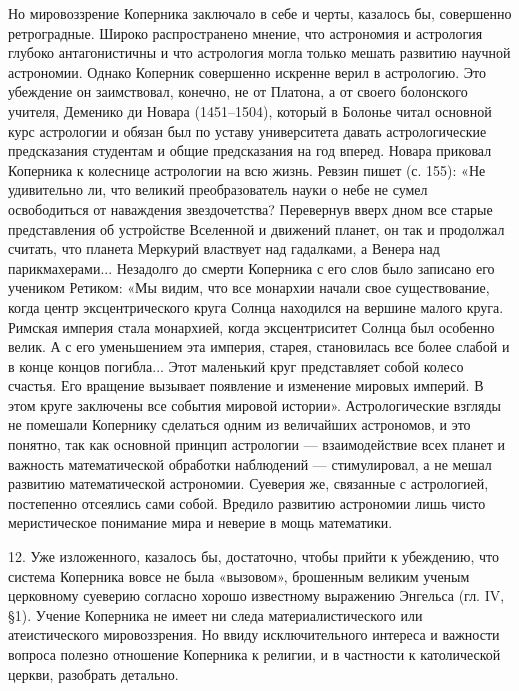 Но  мировоззрение Коперника  заключало в  себе и  черты, казалось  бы,
совершенно ретроградные. Широко  распространено мнение, что астрономия
и  астрология глубоко  антагонистичны  и что  астрология могла  только
мешать  развитию   научной  астрономии.  Однако   Коперник  совершенно
искренне верил в астрологию. Это убеждение он заимствовал, конечно, не
от  Платона,  а  от  своего болонского  учителя,  Деменико  ди  Новара
(1451--1504),  который  в Болонье  читал  основной  курс астрологии  и
обязан был по уставу  университета давать астрологические предсказания
студентам  и  общие  предсказания   на  год  вперед.  Новара  приковал
Коперника к колеснице астрологии на  всю жизнь. Ревзин пишет (с. 155):
«Не удивительно ли, что великий  преобразователь науки о небе не сумел
освободиться от  наваждения звездочетства?  Перевернув вверх  дном все
старые представления об устройстве Вселенной и движений планет, он так
и продолжал считать,  что планета Меркурий властвует  над гадалками, а
Венера над парикмахерами...  Незадолго до смерти Коперника  с его слов
было  записано  его учеником  Ретиком:  «Мы  видим, что  все  монархии
начали свое  существование, когда центр эксцентрического  круга Солнца
находился на  вершине малого  круга. Римская империя  стала монархией,
когда эксцентриситет  Солнца был особенно  велик. А с  его уменьшением
эта империя,  старея, становилась  все более слабой  и в  конце концов
погибла... Этот маленький круг  представляет собой колесо счастья. Его
вращение вызывает появление и изменение  мировых империй. В этом круге
заключены  все события  мировой истории».  Астрологические взгляды  не
помешали  Копернику сделаться  одним из  величайших астрономов,  и это
понятно,  так  как  основной  принцип  астрологии  ---  взаимодействие
всех  планет  и  важность   математической  обработки  наблюдений  ---
стимулировал, а не мешал  развитию математической астрономии. Суеверия
же, связанные с астрологией,  постепенно отсеялись сами собой. Вредило
развитию астрономии лишь чисто  меристическое понимание мира и неверие
в мощь математики.

12.  Уже   изложенного,  казалось  бы,  достаточно,   чтобы  прийти  к
убеждению, что  система Коперника  вовсе не была  «вызовом», брошенным
великим   ученым  церковному   суеверию  согласно   хорошо  известному
выражению  Энгельса  (гл.  IV,  §1).  Учение  Коперника  не  имеет  ни
следа материалистического  или атеистического мировоззрения.  Но ввиду
исключительного   интереса  и   важности  вопроса   полезно  отношение
Коперника к  религии, и в  частности к католической  церкви, разобрать
детально.

